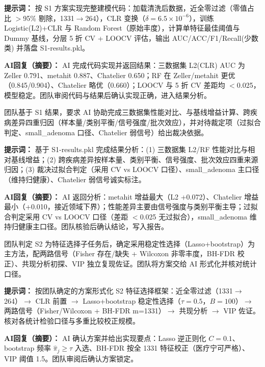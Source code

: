 \documentclass[12pt,a4paper]{ctexart}
\begin{document}
\begin{description}[leftmargin=*, itemindent=0pt, labelwidth=*, labelsep=0.5em]
\textbf{提示词：} 按 S1 方案实现完整建模代码：加载清洗后数据，近全零过滤（零值占比 $>$95\% 剔除，1331$\to$264），CLR 变换（$\delta=6.5\times10^{-6}$），训练 Logistic(L2)+CLR 与 Random Forest（原始丰度），计算单特征最佳阈值与 Dummy 基线，分层 5 折 CV + LOOCV 评估，输出 AUC/ACC/F1/Recall(少数类) 并落盘 S1-results.pkl。

\textbf{AI回复（摘要）：} AI 完成代码实现并返回结果：三数据集 L2(CLR) AUC 为 Zeller 0.791、metahit 0.887、Chatelier 0.650；RF 在 Zeller/metahit 更优（0.845/0.904）、Chatelier 略优（0.660）；LOOCV 与 5 折 CV 差距均 $<$0.025，模型稳定。团队审阅代码与结果后确认实现正确，进入结果分析。

\item[\textbf{交互记录 [AI-1-4] —— S1 结果分析与归因}]

团队基于 S1 结果，要求 AI 协助完成三数据集性能对比、与基线增益计算、跨疾病差异四重归因（样本量/类别平衡/信号强度/批次效应），并对待裁定项（过拟合判定、small\_adenoma 口径、Chatelier 弱信号）给出裁决依据。

\textbf{提示词：} 基于 S1-results.pkl 完成结果分析：(1) 三数据集 L2/RF 性能对比与相对基线增益；(2) 跨疾病差异按样本量、类别平衡、信号强度、批次效应四重来源归因；(3) 裁决过拟合判定（采用 CV vs LOOCV 口径）、small\_adenoma 主口径（维持归健康）、Chatelier 弱信号诚实标注。

\textbf{AI回复（摘要）：} AI 返回分析：metahit 增益最大（L2 +0.072）、Chatelier 增益最小（+0.010，接近领域下界）；性能差异主要由信号强度与类别平衡主导；过拟合判定采用 CV vs LOOCV 口径（差距 $<$0.025 无过拟合），small\_adenoma 维持归健康主口径。团队核验后确认结论，写入报告。

\item[\textbf{交互记录 [AI-2-1] —— S2 方案设计}]

团队判定 S2 为特征选择子任务后，确定采用稳定性选择（Lasso+bootstrap）为主方法，配两路信号（Fisher 存在/缺失 + Wilcoxon 非零丰度，BH-FDR 校正）、共现分析初探、VIP 独立复现佐证。团队将方案交给 AI 形式化并核对统计口径。

\textbf{提示词：} 按团队确定的方案形式化 S2 特征选择框架：近全零过滤（1331$\to$264）$\to$ CLR 前置 $\to$ Lasso+bootstrap 稳定性选择（$\tau=0.5$，$B=100$）$\to$ 两路信号（Fisher/Wilcoxon + BH-FDR m=1331）$\to$ 共现分析 $\to$ VIP 佐证。核对各统计检验口径与多重比较校正规模。

\textbf{AI回复（摘要）：} AI 确认方案并给出实现要点：Lasso 逆正则化 $C=0.1$、bootstrap 频率 $\hat{\pi}_j\ge\tau$ 入选、BH-FDR 按全 1331 特征校正（医疗宁可严格）、VIP 阈值 1.5。团队审阅后确认方案锁定。


\end{description}
\end{document}
